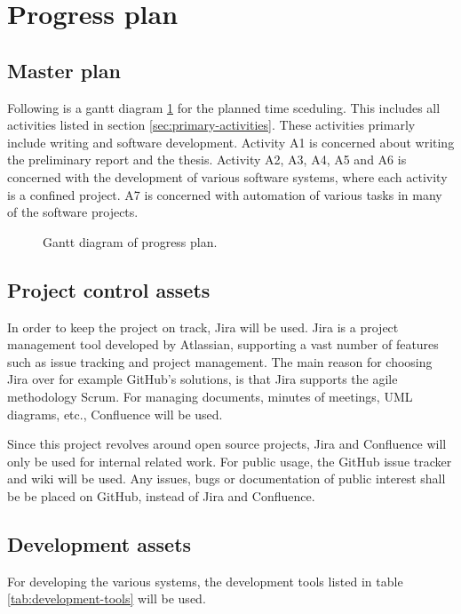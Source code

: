 \section{Progress plan}

\subsection{Master plan}
\label{sec:master-plan}
Following is a gantt diagram \ref{fig:gantt-diagram-progress-plan} for the planned time sceduling. This includes all activities listed in section \ref{sec:primary-activities}. These activities primarly include writing and software development. Activity A1 is concerned about writing the preliminary report and the thesis. Activity A2, A3, A4, A5 and A6 is concerned with the development of various software systems, where each activity is a confined project. A7 is concerned with automation of various tasks in many of the software projects.

{
\begin{figure}[h]
\thispagestyle{empty}
	\clearpage
	
	\caption{Gantt diagram of progress plan.}
	\label{fig:gantt-diagram-progress-plan}
\end{figure}
\clearpage
}

\subsection{Project control assets}
\label{sec:project-control-assets}
In order to keep the project on track, Jira \cite{jira} will be used. Jira is a project management tool developed by Atlassian, supporting a vast number of features such as issue tracking and project management. The main reason for choosing Jira over for example GitHub's solutions, is that Jira supports the agile methodology Scrum. For managing documents, minutes of meetings, UML diagrams, etc., Confluence \cite{confluence} will be used.

Since this project revolves around open source projects, Jira and Confluence will only be used for internal related work. For public usage, the GitHub issue tracker and wiki will be used. Any issues, bugs or documentation of public interest shall be be placed on GitHub, instead of Jira and Confluence.

\subsection{Development assets}
For developing the various systems, the development tools listed in table \ref{tab:development-tools} will be used.

